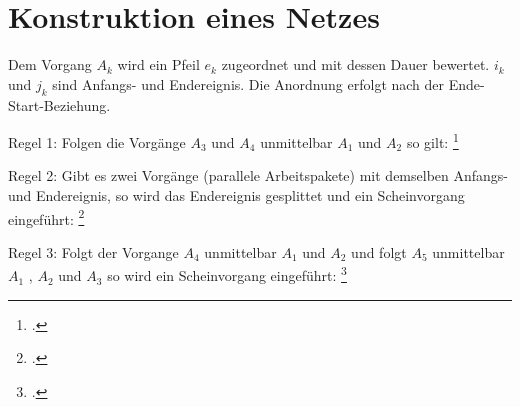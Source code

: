 \documentclass{lehramt-informatik}
\begin{document}
%

\section{Konstruktion eines Netzes}

Dem Vorgang $A_k$ wird ein Pfeil $e_k$ zugeordnet und mit dessen Dauer
bewertet.
%
$i_k$ und $j_k$ sind Anfangs- und Endereignis.
%
Die Anordnung erfolgt nach der Ende-Start-Beziehung.

\begin{center}
\end{center}

Regel 1: Folgen die Vorgänge $A_3$ und $A_4$ unmittelbar $A_1$ und $A_2$
so gilt:
\footcite[Seite 24]{sosy:fs:3}

\begin{center}
\end{center}

Regel 2: Gibt es zwei Vorgänge (parallele Arbeitspakete) mit demselben
Anfangs- und Endereignis, so wird das Endereignis gesplittet und ein
Scheinvorgang eingeführt:
\footcite[Seite 25]{sosy:fs:3}

\begin{center}
\end{center}

Regel 3: Folgt der Vorgange $A_4$ unmittelbar $A_1$ und $A_2$ und folgt
$A_5$ unmittelbar $A_1$ , $A_2$ und $A_3$ so wird ein Scheinvorgang
eingeführt:
\footcite[Seite 26]{sosy:fs:3}
\end{document}
